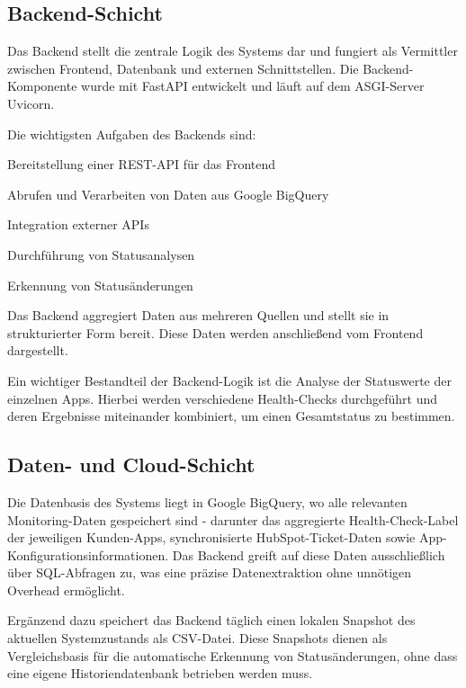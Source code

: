 \subsection{Backend-Schicht}
Das Backend stellt die zentrale Logik des Systems dar und fungiert als Vermittler zwischen Frontend, Datenbank und externen Schnittstellen. Die Backend-Komponente wurde mit FastAPI entwickelt und läuft auf dem ASGI-Server Uvicorn.

Die wichtigsten Aufgaben des Backends sind:

\begin{compactitem}
    \item Bereitstellung einer REST-API für das Frontend
    \item Abrufen und Verarbeiten von Daten aus Google BigQuery
    \item Integration externer APIs
    \item Durchführung von Statusanalysen
    \item Erkennung von Statusänderungen
\end{compactitem}

Das Backend aggregiert Daten aus mehreren Quellen und stellt sie in strukturierter Form bereit. Diese Daten werden anschließend vom Frontend dargestellt.

Ein wichtiger Bestandteil der Backend-Logik ist die Analyse der Statuswerte der einzelnen Apps. Hierbei werden verschiedene Health-Checks durchgeführt und deren Ergebnisse miteinander kombiniert, um einen Gesamtstatus zu bestimmen.

\subsection{Daten- und Cloud-Schicht}
Die Datenbasis des Systems liegt in Google BigQuery, wo alle relevanten Monitoring-Daten gespeichert sind - darunter das aggregierte Health-Check-Label der jeweiligen Kunden-Apps, synchronisierte HubSpot-Ticket-Daten sowie App-Konfigurationsinformationen. Das Backend greift auf diese Daten ausschließlich über SQL-Abfragen zu, was eine präzise Datenextraktion ohne unnötigen Overhead ermöglicht.

Ergänzend dazu speichert das Backend täglich einen lokalen Snapshot des aktuellen Systemzustands als CSV-Datei. Diese Snapshots dienen als Vergleichsbasis für die automatische Erkennung von Statusänderungen, ohne dass eine eigene Historiendatenbank betrieben werden muss.

